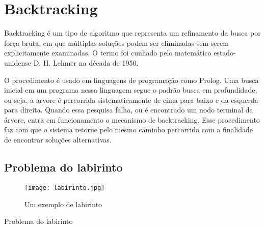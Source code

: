 \section{Backtracking} \label{sec:backtracking}

Backtracking é um tipo de algoritmo que representa um refinamento da busca por força bruta,
em que múltiplas soluções podem ser eliminadas sem serem explicitamente examinadas. O termo
foi cunhado pelo matemático estado-unidense D. H. Lehmer na década de 1950.

O procedimento é usado em linguagens de programação como Prolog. Uma busca inicial 
em um programa nessa linguagem segue o padrão busca em profundidade, ou seja, a árvore
é percorrida sistematicamente de cima para baixo e da esquerda para direita. Quando essa
pesquisa falha, ou é encontrado um nodo terminal da árvore, entra em funcionamento o
mecanismo de backtracking. Esse procedimento faz com que o sistema retorne pelo mesmo 
caminho percorrido com a finalidade de encontrar soluções alternativas. 

\subsection{Problema do labirinto}

\begin{figure}[ht]
  \centering
  \texttt{[image: labirinto.jpg]}
  \caption{Um exemplo de labirinto}
  \label{fig:labirinto}
\end{figure}

Problema do labirinto